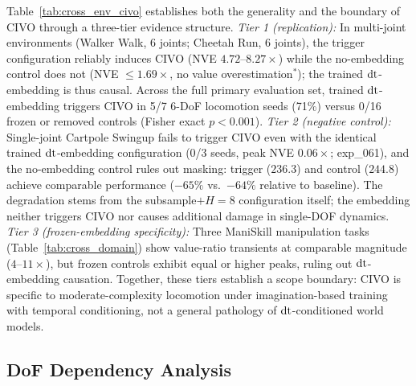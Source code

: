 Table~\ref{tab:cross_env_civo} establishes both the generality and the boundary of CIVO through a three-tier evidence structure. \emph{Tier 1 (replication):} In multi-joint environments (Walker Walk, 6 joints; Cheetah Run, 6 joints), the trigger configuration reliably induces CIVO (NVE $4.72$--$8.27\times$) while the no-embedding control does not (NVE $\leq 1.69\times$, no value overestimation$^*$); the trained $\mathrm{dt}$-embedding is thus causal. Across the full primary evaluation set, trained $\mathrm{dt}$-embedding triggers CIVO in 5/7 6-DoF locomotion seeds (71\%) versus 0/16 frozen or removed controls (Fisher exact $p < 0.001$). \emph{Tier 2 (negative control):} Single-joint Cartpole Swingup fails to trigger CIVO even with the identical trained $\mathrm{dt}$-embedding configuration (0/3 seeds, peak NVE $0.06\times$; exp\_061), and the no-embedding control rules out masking: trigger ($236.3$) and control ($244.8$) achieve comparable performance ($-65\%$ vs.\ $-64\%$ relative to baseline). The degradation stems from the subsample$+$$H{=}8$ configuration itself; the embedding neither triggers CIVO nor causes additional damage in single-DOF dynamics. \emph{Tier 3 (frozen-embedding specificity):} Three ManiSkill manipulation tasks (Table~\ref{tab:cross_domain}) show value-ratio transients at comparable magnitude ($4$--$11\times$), but frozen controls exhibit equal or higher peaks, ruling out $\mathrm{dt}$-embedding causation. Together, these tiers establish a scope boundary: CIVO is specific to moderate-complexity locomotion under imagination-based training with temporal conditioning, not a general pathology of $\mathrm{dt}$-conditioned world models.

\subsection{DoF Dependency Analysis}
\label{sec:dof_boundary}

